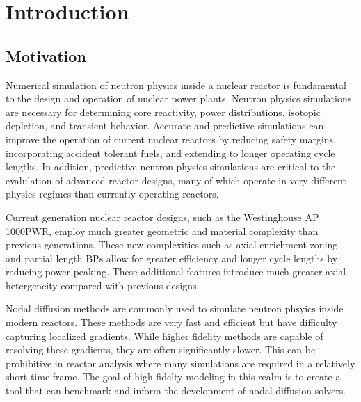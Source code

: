 \chapter{Introduction}
\label{chap:intro}

\section{Motivation}
\label{sec:chap1-motivation}


Numerical simulation of neutron physics inside a nuclear reactor is fundamental to the design and operation of nuclear power plants. Neutron physics simulations are necessary for determining core reactivity, power distributions, isotopic depletion, and transient behavior. Accurate and predictive simulations can improve the operation of current nuclear reactors by reducing safety margins, incorporating accident tolerant fuels, and extending to longer operating cycle lengths. In addition, predictive neutron physics simulations are critical to the evalulation of advanced reactor designs, many of which operate in very different physics regimes than currently operating reactors. 

Current generation nuclear reactor designs, such as the Westinghouse AP 1000\texttrademark \ac{PWR}, employ much greater geometric and material complexity than previous generations. These new complexities such as axial enrichment zoning and partial length \ac{BP}s allow for greater efficiency and longer cycle lengths by reducing power peaking. These additional features introduce much greater axial hetergeneity compared with previous designs.

Nodal diffusion methods are commonly used to simulate neutron phsyics inside modern reactors. These methods are very fast and efficient but have difficulty capturing localized gradients. While higher fidelity methods are capable of resolving these gradients, they are often significantly slower. This can be prohibitive in reactor analysis where many simulations are required in a relatively short time frame. The goal of high fidelty modeling in this realm is to create a tool that can benchmark and inform the development of nodal diffusion solvers. 

